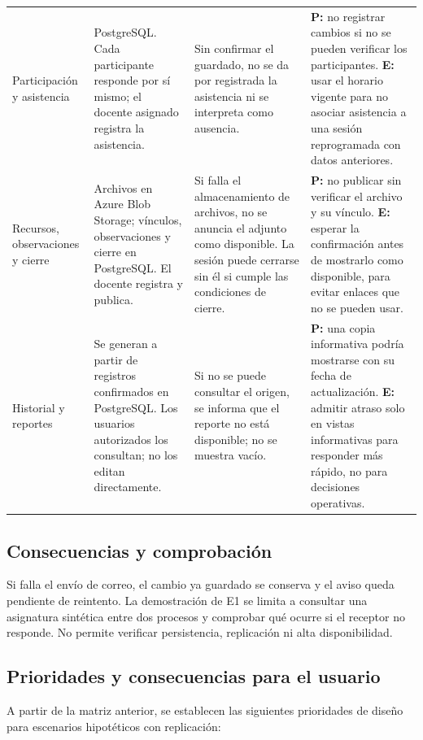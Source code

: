 \begin{longtable}{@{}>{\raggedright\arraybackslash}p{}>{\raggedright\arraybackslash}p{}>{\raggedright\arraybackslash}p{}>{\raggedright\arraybackslash}p{}@{}}
Participación y asistencia &
PostgreSQL. Cada participante responde por sí mismo; el docente asignado registra la asistencia. &
Sin confirmar el guardado, no se da por registrada la asistencia ni se interpreta como ausencia. &
\textbf{P:} no registrar cambios si no se pueden verificar los participantes.
\textbf{E:} usar el horario vigente para no asociar asistencia a una sesión reprogramada con datos anteriores. \\

Recursos, observaciones y cierre &
Archivos en Azure Blob Storage; vínculos, observaciones y cierre en PostgreSQL. El docente registra y publica. &
Si falla el almacenamiento de archivos, no se anuncia el adjunto como disponible. La sesión puede cerrarse sin él si cumple las condiciones de cierre. &
\textbf{P:} no publicar sin verificar el archivo y su vínculo.
\textbf{E:} esperar la confirmación antes de mostrarlo como disponible, para evitar enlaces que no se pueden usar. \\

Historial y reportes &
Se generan a partir de registros confirmados en PostgreSQL. Los usuarios autorizados los consultan; no los editan directamente. &
Si no se puede consultar el origen, se informa que el reporte no está disponible; no se muestra vacío. &
\textbf{P:} una copia informativa podría mostrarse con su fecha de actualización.
\textbf{E:} admitir atraso solo en vistas informativas para responder más rápido, no para decisiones operativas. \\
\end{longtable}

\subsection{Consecuencias y comprobación}
Si falla el envío de correo, el cambio ya guardado se conserva y el aviso queda pendiente de reintento. La demostración de E1 se limita a consultar una asignatura sintética entre dos procesos y comprobar qué ocurre si el receptor no responde. No permite verificar persistencia, replicación ni alta disponibilidad.


\subsection{Prioridades y consecuencias para el usuario}

A partir de la matriz anterior, se establecen las siguientes prioridades de diseño para escenarios hipotéticos con replicación:

